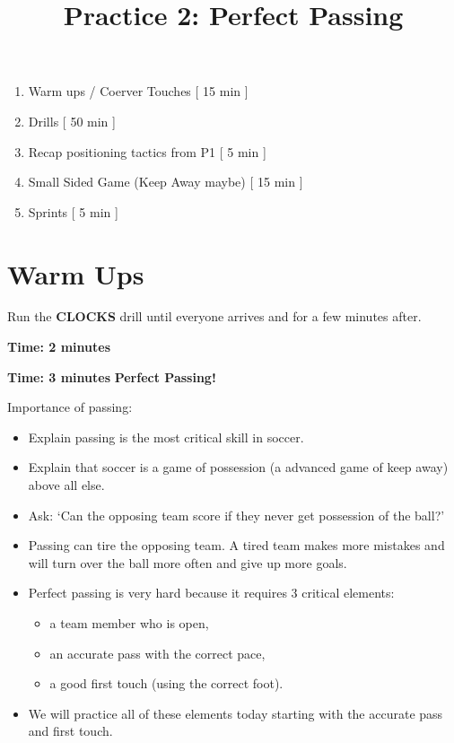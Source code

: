 \documentclass[10pt,letterpaper]{article}
\title{\vspace{-.5in}Practice 2: Perfect Passing}
\author{\vspace{-.5in}}
\date{\vspace{-.5in}}
\newenvironment{agendablock}[1]{%
    \tcolorbox[beamer,%
    noparskip,breakable,
    colback=LightGray,colframe=Black,%
    colbacklower=Gray!75!LightGray,%
    title=#1]}%
    {\endtcolorbox}
\newenvironment{myalertblock}[1]{%
    \tcolorbox[beamer,%
    noparskip,breakable,
    colback=LightCoral,colframe=DarkRed,%
    colbacklower=Tomato!75!LightCoral,%
    title=#1]}%
    {\endtcolorbox}
\begin{document}
\selectfont


\maketitle

\begin{agendablock}{Practice Activities}
    \begin{enumerate}
        \item Warm ups / Coerver Touches [ 15 min ]
        \item Drills [ 50 min ]
        \item Recap positioning tactics from P1 [ 5 min ]
        \item Small Sided Game (Keep Away maybe) [ 15 min ]
        \item Sprints [ 5 min ] 
    \end{enumerate}
\end{agendablock}

\section{Warm Ups}
Run the \textbf{CLOCKS} drill until everyone arrives and for a few minutes after.

\textbf{Time: 2 minutes}


\textbf{Time: 3 minutes}
\begin{myalertblock}{Theme of the Practice}
    \textbf{Perfect Passing!}

    Importance of passing:
    \begin{itemize}
        \setlength{\itemsep}{0pt}
        \setlength{\parskip}{0pt}
        \setlength{\parsep}{0pt}
        \item Explain passing is the most critical skill in soccer.
        \item Explain that soccer is a game of possession (a advanced game of keep away) above all else.
        \item Ask: `Can the opposing team score if they never get possession of the ball?'
        \item Passing can tire the opposing team.  A tired team makes more mistakes and will turn over the ball more often and give up more goals.
        \item Perfect passing is very hard because it requires 3 critical elements:
        \begin{itemize}
            \setlength{\itemsep}{0pt}
            \setlength{\parskip}{0pt}
            \setlength{\parsep}{0pt}
            \item a team member who is open,
            \item an accurate pass with the correct pace,
            \item a good first touch (using the correct foot).
        \end{itemize}
        \item We will practice all of these elements today starting with the accurate pass and first touch.
    \end{itemize}
\end{myalertblock}
\end{document}

